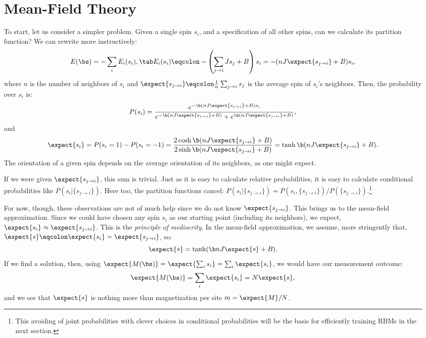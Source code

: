 \section{Mean-Field Theory}
To start, let us consider a simpler problem. Given a single spin
$s_i$, and a specification of all other spins, can we calculate its
partition function? We can rewrite  more
instructively:%
\begin{equation}%
  E(\bs)=-\sum_i E_i(s_i),\tab E_i(s_i)\eqcolon-\left(\sum_{j\rightarrow i} J s_j + B\right)s_i= -(nJ\expect{s_{j\rightarrow i}}+B)s_i,
\end{equation}%
where $n$ is the number of neighbors of $s_i$ and
$\expect{s_{j\rightarrow i}}\eqcolon\frac{1}{n}\sum_{j\rightarrow i} s_j$ is the average
spin of $s_i$'s neighbors. Then, the probability over $s_i$ is:
\begin{equation}%
  P(s_i)=\frac{e^{-\b (nJ\expect{s_{j\rightarrow i}}+B)s_i}}{e^{-\b (nJ\expect{s_{j\rightarrow i}}+B)}+e^{\b (nJ\expect{s_{j\rightarrow i}}+B)}},
\end{equation}%
and
\begin{equation}%
  \expect{s_i}=P(s_i=1)-P(s_i=-1)= \frac{2\cosh \b (nJ\expect{s_{j\rightarrow i}}+B)}{2\sinh \b (nJ \expect{s_{j\rightarrow i}}+B)}=\tanh \b (nJ\expect{s_{j\rightarrow i}}+B).
\end{equation}%
The orientation of a given spin depends on the average orientation of
its neighbors, as one might expect.

If we were given $\expect{s_{j\rightarrow i}}$, this sum is
trivial. Just as it is easy to calculate relative probabilities, it is
easy to calculate conditional probabilities like
$P(s_i\rvert \{s_{j\rightarrow i}\})$. Here too, the partition
functions cancel:
$P(s_i\rvert \{s_{j\rightarrow i}\})=P(s_i,\{s_{j\rightarrow i}\})/
P(\{s_{j\rightarrow i}\})$.\footnote{This avoiding of joint
  probabilities with clever choices in conditional probabilities will
  be the basis for efficiently training RBMs in the next section.}

For now, though, these observations are not of much help since we do
not know $\expect{s_{j\rightarrow i}}$. This brings us to the
mean-field approximation. Since we could have chosen any spin $s_i$ as
our starting point (including its neighbors), we expect,
$\expect{s_i}\approx\expect{s_{j\rightarrow i}}$. This is the
\textit{principle of mediocrity}. In the mean-field approximation, we
assume, more stringently that, $\expect{s}\eqcolon\expect{s_i}=\expect{s_{j\rightarrow i}}$, so:
\begin{equation}%
  \expect{s}=\tanh (\b n J \expect{s}+B).\label{eq:transcendental}
\end{equation}%
If we find a solution, then, using
$\expect{M(\bs)}=\expect{\sum_i s_i}=\sum_i \expect{s_i}$, we would
have our measurement outcome:%
\begin{equation}%
  \expect{M(\bs)}=\sum_i \expect{s_i}= N \expect{s},
\end{equation}%
and we see that $\expect{s}$ is nothing more than
magnetization per site $m=\expect{M}/N$.

